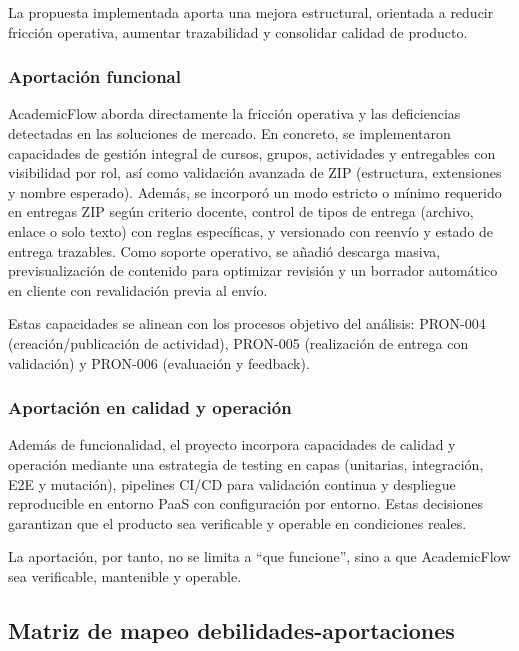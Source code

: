 La propuesta implementada aporta una mejora estructural,
orientada a reducir fricci\'on operativa,
aumentar trazabilidad y consolidar calidad de producto.

\subsubsection{Aportaci\'on funcional}

AcademicFlow aborda directamente la fricci\'on operativa y las deficiencias detectadas en las soluciones de mercado. En concreto, se implementaron capacidades de gesti\'on integral de cursos, grupos, actividades y entregables con visibilidad por rol, as\'i como validaci\'on avanzada de ZIP (estructura, extensiones y nombre esperado). Adem\'as, se incorpor\'o un modo estricto o m\'inimo requerido en entregas ZIP seg\'un criterio docente, control de tipos de entrega (archivo, enlace o solo texto) con reglas espec\'ificas, y versionado con reenv\'io y estado de entrega trazables. Como soporte operativo, se a\~nadi\'o descarga masiva, previsualizaci\'on de contenido para optimizar revisi\'on y un borrador autom\'atico en cliente con revalidaci\'on previa al env\'io.

Estas capacidades se alinean con los procesos objetivo del an\'alisis: PRON-004 (creaci\'on/publicaci\'on de actividad), PRON-005 (realizaci\'on de entrega con validaci\'on) y PRON-006 (evaluaci\'on y feedback).

\subsubsection{Aportaci\'on en calidad y operaci\'on}

Adem\'as de funcionalidad, el proyecto incorpora capacidades de calidad y operaci\'on mediante una estrategia de testing en capas (unitarias, integraci\'on, E2E y mutaci\'on), pipelines CI/CD para validaci\'on continua y despliegue reproducible en entorno PaaS con configuraci\'on por entorno. Estas decisiones garantizan que el producto sea verificable y operable en condiciones reales.

La aportaci\'on, por tanto, no se limita a ``que funcione'',
sino a que AcademicFlow sea verificable, mantenible y operable.

\subsection{Matriz de mapeo debilidades-aportaciones}

